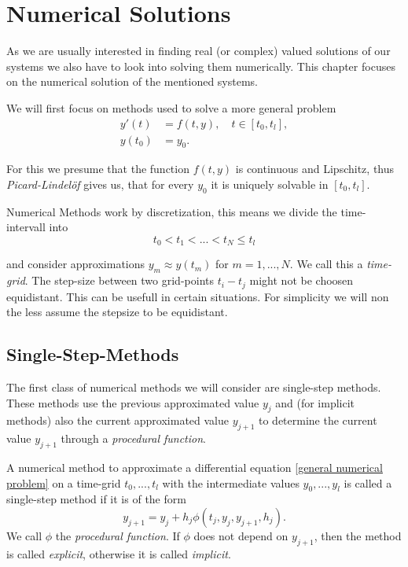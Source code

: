 \chapter{Numerical Solutions}
As we are usually interested in finding real (or complex) valued solutions of our systems we also have to look into solving them numerically. This chapter focuses on the numerical solution of the mentioned systems.

We will first focus on methods used to solve a more general problem
\begin{align}
	\label{general numerical problem}
	y'(t) &= f(t,y), \quad t \in [t_0, t_l], \\
	y(t_0) &= y_0.
\end{align}


For this we presume that the function $f(t,y)$ is continuous and Lipschitz, thus \emph{Picard-Lindelöf} \cite{NumerikGewöhnlicherDifferentialgleichungen} gives us, that for every $y_0$ it is uniquely solvable in $[t_0, t_l]$.

Numerical Methods work by discretization, this means we divide the time-intervall into
\begin{displaymath}
	t_0 < t_1 < ... < t_N \leq t_l
\end{displaymath}

and consider approximations $y_m \approx y(t_m)$ for $m=1,...,N$. We call this a \emph{time-grid}. The step-size between two grid-points $t_i - t_j$ might not be choosen equidistant. This can be usefull in certain situations. For simplicity we will non the less assume the stepsize to be equidistant.

\section{Single-Step-Methods}
	The first class of numerical methods we will consider are single-step methods. These methods use the previous approximated value $y_j$ and (for implicit methods) also the current approximated value $y_{j+1}$ to determine the current value $y_{j+1}$ through a \emph{procedural function}.
	
	\begin{definition}
		A numerical method to approximate a differential equation \ref{general numerical problem} on a time-grid $t_0,...,t_l$ with the intermediate values $y_0,...,y_l$ is called a single-step method if it is of the form
		\begin{equation}
			\label{single-step method}
			y_{j+1} = y_j + h_j \phi(t_j,y_j, y_{j+1},h_j).
		\end{equation}
		We call $\phi$ the \emph{procedural function}. If $\phi$ does not depend on $y_{j+1}$, then the method is called \emph{explicit}, otherwise it is called \emph{implicit}.
	\end{definition}


